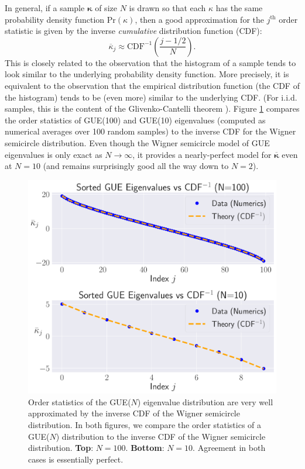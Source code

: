 \documentclass[aps,pra, twocolumn]{revtex4-1}
\newcommand{\bvec}[1]{\boldsymbol{#1}}
\begin{document}
In general, if a sample $\bvec{\kappa}$ of size $N$ is drawn so that each $\kappa$ has the same probability density 
function $\mathrm{Pr}(\kappa)$, then a good approximation for the $j^{\mathrm{th}}$ order statistic is given by the inverse 
\emph{cumulative} distribution function (CDF):
\begin{equation}
\overline{\kappa}_j \approx \mathrm{CDF}^{-1}\left(\frac{j-1/2}{N}\right).
\end{equation}
This is closely related to the observation that the histogram of a sample tends to look similar to the underlying probability density function.  More precisely, it is equivalent to the observation that the empirical distribution function (the CDF of the histogram) tends to be (even more) similar to the underlying CDF.  (For i.i.d. samples, this is the content of the Glivenko-Cantelli theorem \cite{VanderVaart2000}).  Figure \ref{fig:orderstatistics2} compares the order statistics of GUE(100) and GUE(10) eigenvalues (computed as numerical averages over 100 random samples) to the inverse CDF for the Wigner semicircle distribution.  Even though the Wigner semicircle model of GUE eigenvalues is only exact as $N\to\infty$, it provides a nearly-perfect model for $\overline{\bvec{\kappa}}$ even at $N=10$ (and remains surprisingly good all the way down to $N=2$).

\begin{figure}[h!]
\includegraphics[width=\columnwidth]{Images/Figure_5.pdf}
\caption{Order statistics of the GUE($N$) eigenvalue distribution are very well approximated by the inverse CDF of the Wigner semicircle distribution.  In both figures, we compare the order statistics of a GUE($N$) distribution to the inverse CDF of the Wigner semicircle distribution. \textbf{Top}:  $N=100$.  \textbf{Bottom}:  $N=10$.
Agreement in both cases is essentially perfect.}
\label{fig:orderstatistics2}
\end{figure}
\end{document}

